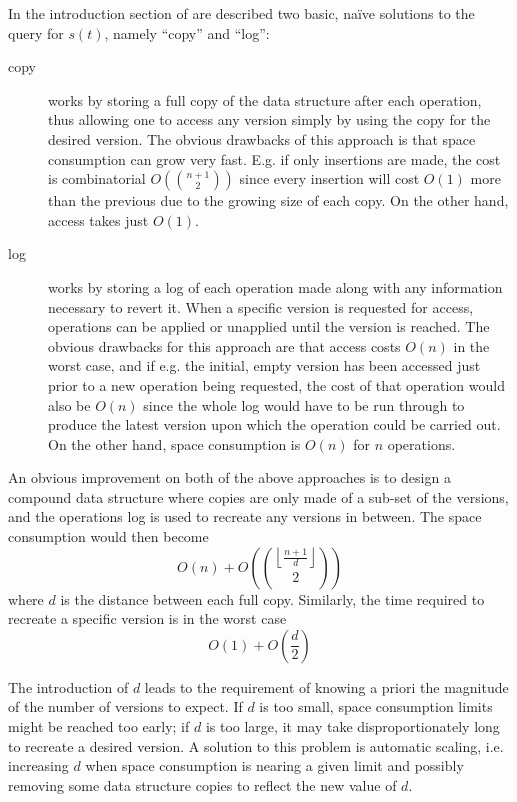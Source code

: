 In the introduction section of \cite{Tsotras1995237} are described two basic,
na\"ive solutions to the query for $s(t)$, namely ``copy'' and ``log'':
\begin{description}
  \item[copy] works by storing a full copy of the data structure after each
  operation, thus allowing one to access any version simply by using the copy
  for the desired version. The obvious drawbacks of this approach is that space
  consumption can grow very fast. E.g. if only insertions are made, the cost is
  combinatorial $O\left(\binom{n+1}{2}\right)$ since every insertion will cost
  $O(1)$ more than the previous due to the growing size of each copy. On the
  other hand, access takes just $O(1)$.

  \item[log] works by storing a log of each operation made along with any
  information necessary to revert it. When a specific version is requested for
  access, operations can be applied or unapplied until the version is reached. 
  The obvious drawbacks for this approach are that access costs $O(n)$ in the 
  worst case, and if e.g. the initial, empty version has been accessed just 
  prior to a new operation being requested, the cost of that operation would 
  also be $O(n)$ since the whole log would have to be run through to produce 
  the latest version upon which the operation could be carried out. On the other
  hand, space consumption is $O(n)$ for $n$ operations.
\end{description}

An obvious improvement on both of the above approaches is to design a compound
data structure where copies are only made of a sub-set of the versions, and the
operations log is used to recreate any versions in between. The space
consumption would then become
$$O(n)+O\left(\binom{\left\lfloor{\frac{n+1}{d}}\right\rfloor}{2}\right)$$ where
$d$ is the distance between each full copy. Similarly, the time required to
recreate a specific version is in the worst case
$$O(1)+O\left(\frac{d}{2}\right)$$

The introduction of $d$ leads to the requirement of knowing a priori the
magnitude of the number of versions to expect. If $d$ is too small, space
consumption limits might be reached too early; if $d$ is too large, it may take
disproportionately long to recreate a desired version. A solution to this
problem is automatic scaling, i.e. increasing $d$ when space consumption is
nearing a given limit and possibly removing some data structure copies to
reflect the new value of $d$.

